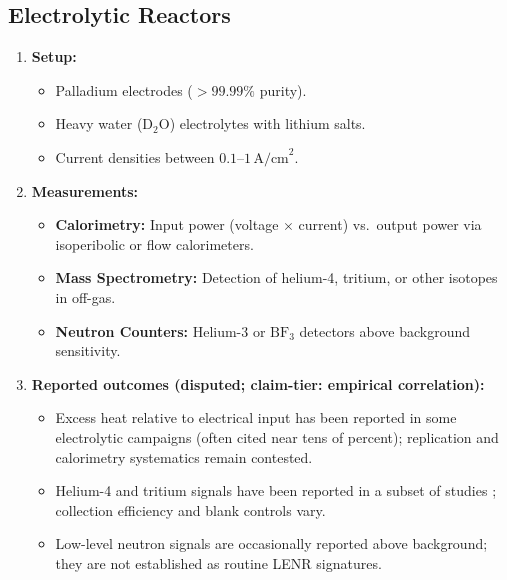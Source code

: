 \documentclass[11pt,a4paper]{article}
\begin{document}
\subsection{Electrolytic Reactors}

\begin{enumerate}
\def\labelenumi{\arabic{enumi}.}
\item
  \textbf{Setup:}

  \begin{itemize}
    \item
    Palladium electrodes ($>99.99\%$ purity).\\
  \item
    Heavy water ($\text{D}_2\text{O}$) electrolytes with lithium salts.\\
  \item
    Current densities between $0.1\text{--}1\,\text{A/cm}^2$.\\
  \end{itemize}
\item
  \textbf{Measurements:}

  \begin{itemize}
    \item
    \textbf{Calorimetry:} Input power (voltage $\times$ current) vs.~output power via isoperibolic or flow calorimeters.\\
  \item
    \textbf{Mass Spectrometry:} Detection of helium-4, tritium, or other isotopes in off-gas.\\
  \item
    \textbf{Neutron Counters:} Helium-3 or $\text{BF}_3$ detectors above background sensitivity.\\
  \end{itemize}
\item
  \textbf{Reported outcomes (disputed; claim-tier: empirical correlation):}

  \begin{itemize}
    \item
    Excess heat relative to electrical input has been reported in some electrolytic campaigns (often cited near tens of percent); replication and calorimetry systematics remain contested.\\
  \item
    Helium-4 and tritium signals have been reported in a subset of studies \citep{miles1993,bockris1991,wolf1990}; collection efficiency and blank controls vary.\\
  \item
    Low-level neutron signals are occasionally reported above background; they are not established as routine LENR signatures.
  \end{itemize}
\end{enumerate}
\end{document}
